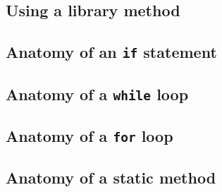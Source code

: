 \documentclass[full]{l3doc}
\begin{document}
\subsection{Using a library method~\autocite[30]{sedgewick_wayne_2016}}

\subsection{Anatomy of an \texttt{if} statement~\autocite[51]{sedgewick_wayne_2016}}

\subsection{Anatomy of a \texttt{while} loop~\autocite[54]{sedgewick_wayne_2016}}

\subsection{Anatomy of a \texttt{for} loop~\autocite[59]{sedgewick_wayne_2016}}

\subsection{Anatomy of a static method~\autocite[196]{sedgewick_wayne_2016}}
\end{document}
